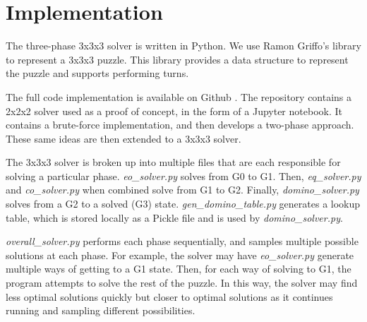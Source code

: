 \documentclass{article}
\begin{document}

\section{Implementation}

The three-phase 3x3x3 solver is written in Python. We use Ramon Griffo's library \cite{git-lib} to represent a 3x3x3 puzzle. This library provides a data structure to represent the puzzle and supports performing turns.

The full code implementation is available on Github \cite{git-solver}. The repository contains a 2x2x2 solver used as a proof of concept, in the form of a Jupyter notebook. It contains a brute-force implementation, and then develops a two-phase approach. These same ideas are then extended to a 3x3x3 solver.

The 3x3x3 solver is broken up into multiple files that are each responsible for solving a particular phase. \emph{eo\_solver.py} solves from G0 to G1. Then, \emph{eq\_solver.py} and \emph{co\_solver.py} when combined solve from G1 to G2. Finally, \emph{domino\_solver.py} solves from a G2 to a solved (G3) state. \emph{gen\_domino\_table.py} generates a lookup table, which is stored locally as a Pickle file and is used by \emph{domino\_solver.py}.

\emph{overall\_solver.py} performs each phase sequentially, and samples multiple possible solutions at each phase. For example, the solver may have \emph{eo\_solver.py} generate multiple ways of getting to a G1 state. Then, for each way of solving to G1, the program attempts to solve the rest of the puzzle. In this way, the solver may find less optimal solutions quickly but closer to optimal solutions as it continues running and sampling different possibilities.

\end{document}
